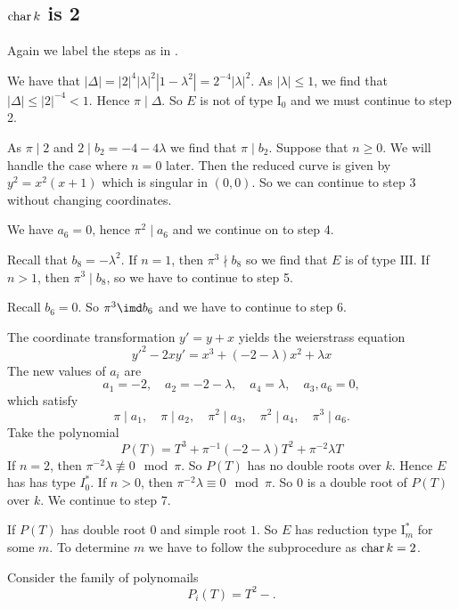 \subsection{$\operatorname{char} k$ is 2} \label{sec:char_k_is_2}
Again we label the steps as in \cite[sec.\ IV.9]{silvermanAdvancedTopicsArithmetic1994}.

We have that $|\Delta| = |2|^{4} |\lambda|^2 |1-\lambda^2| = 2^{-4}|\lambda|^2$.
As $|\lambda|\le 1$, we find that $|\Delta| \le |2|^{-4} < 1$. 
Hence $\pi \mid \Delta$. So $E$ is not of type $\mathrm I_0$ and we must continue to step 2.

As $\pi \mid 2$ and $2 \mid b_2 = -4 - 4\lambda$ we find that $\pi \mid b_2$. 
Suppose that $n \ge 0$. We will handle the case where $n = 0$ later. 
Then the reduced curve is given by $y^2 = x^2(x+1)$ which is singular in $(0, 0)$. 
So we can continue to step  $3$ without changing coordinates. 

We have $a_6 = 0$, hence $\pi^2 \mid a_6$ and we continue on to step 4.

Recall that  $b_8 = -\lambda^2$. 
If  $n = 1$, then $\pi^3 \nmid b_8$ so we find that $E$ is of type $\mathrm{III}$.
If  $n > 1$, then $\pi^3 \mid b_8$, so we have to continue to step 5.

Recall $b_6 = 0$. So $\pi^3 \imd b_6$ and we have to continue to step 6.

The coordinate transformation $y' = y + x$ yields the weierstrass equation  \[
	y'^2 - 2xy'  = x^3 + (-2 - \lambda)x^2 + \lambda x
\]
The new values of $a_i$ are \[
a_1 = -2,\quad a_2 = -2 -\lambda,\quad a_4 = \lambda,\quad a_3,a_6 =0
,\] 
which satisfy \[
\pi \mid a_1,\quad \pi\mid a_2,\quad  \pi^2 \mid a_3,\quad \pi^2 \mid a_4,\quad \pi^3 \mid a_6
.\] 
Take the polynomial \[
	P(T) = T^3 + \pi^{-1}(-2 -\lambda ) T^2 + \pi^{-2}\lambda T 
\] 
If $n = 2$, then $\pi^{-2}\lambda \not\equiv 0 \mod \pi$. 
So $P(T)$ has no double roots over $k$.
Hence $E$ has has type $I_0^*$. 
If $n >0$, then $\pi^{-2} \lambda \equiv 0 \mod \pi$.
So $0$ is a double root of $P(T)$ over $k$. 
We continue to step 7.

If $P(T)$ has double root  $0$ and simple root $1$. 
So  $E$ has reduction type $\mathrm I_m^*$ for some $m$.
To determine $m$ we have to follow the subprocedure as $\operatorname{char} k = 2$.

Consider the family of polynomails \[
	P_i(T) = T^2 - 
.\] 










